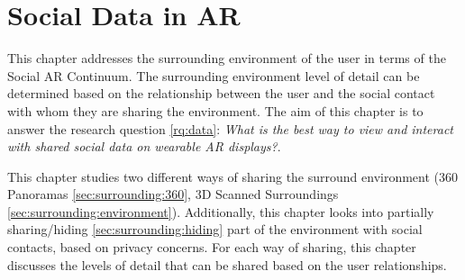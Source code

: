\chapter{Social Data in AR} 
\label{ch:data} 

This chapter addresses the surrounding environment of the user in terms of the Social AR Continuum. The surrounding environment level of detail can be determined based on the relationship between the user and the social contact with whom they are sharing the environment. The aim of this chapter is to answer the research question \ref{rq:data}: \textit{What is the best way to view and interact with shared social data on wearable AR displays?}. 

This chapter studies two different ways of sharing the surround environment (360 Panoramas \ref{sec:surrounding:360}, 3D Scanned Surroundings \ref{sec:surrounding:environment}). Additionally, this chapter looks into partially sharing/hiding \ref{sec:surrounding:hiding} part of the environment with social contacts, based on privacy concerns. For each way of sharing, this chapter discusses the levels of detail that can be shared based on the user relationships. 






